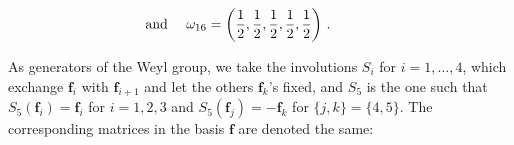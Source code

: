 \documentclass[11pt]{amsart}
\begin{document}
\vspace{-0.2cm}
\begin{align*}%
{}^{} \hspace{-1.1cm} \mbox{and } \quad \omega_{{16}}= 
 \left({\frac{1}{2}}, {\frac{1}{2}}, {\frac{1}{2}}, {\frac{1}{2}}, {\frac{1}{2}}\right)\, . 
 \nonumber
\end{align*}%





As generators of the Weyl group, we take the involutions  $S_i$ for $i=1,\ldots,4$, which exchange  $\boldsymbol{f}_i $ with $\boldsymbol{f}_{i+1} $ and let the others $\boldsymbol{f}_k $'s fixed, and $S_5$ is the one such that   $S_5(\boldsymbol{f}_i)=\boldsymbol{f}_i$ for $i=1,2,3$ and $S_5(\boldsymbol{f}_j)=-\boldsymbol{f}_k$ for $\{j,k\}=\{4,5\}$. The corresponding matrices in the basis $\boldsymbol{f}$ are denoted the same: 
\end{document}
